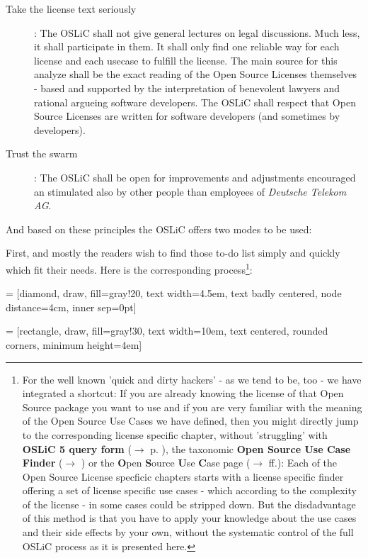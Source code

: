 \begin{description}
  \item[Take the license text seriously]: The OSLiC shall not give general
  lectures on legal discussions. Much less, it shall participate in them. It
  shall only find one reliable way for each license and each usecase to fulfill
  the license. The main source for this analyze shall be the exact reading of
  the Open Source Licenses themselves - based and supported by the
  interpretation of benevolent lawyers and rational argueing software
  developers. The OSLiC shall respect that Open Source Licenses are written for
  software developers (and sometimes by developers).
  
  \item[Trust the swarm]: The OSLiC shall be open for improvements and
  adjustments encouraged an stimulated also by other people than employees of
  \emph{Deutsche Telekom AG}.
\end{description}

And based on these principles the OSLiC offers two modes to be used:

First, and mostly the readers wish to find those to-do list simply and quickly
which fit their needs. Here is the corresponding process\footnote{For the well
known 'quick and dirty hackers' - as we tend to be, too - we have integrated a
shortcut: If you are already knowing the license of that Open Source package you
want to use and if you are very familiar with the meaning of the Open Source Use
Cases we have defined, then you might directly jump to the corresponding license
specific chapter, without 'struggling' with \textbf{OSLiC 5 query form}
($\rightarrow$ p. \pageref{OSLiCStandardFormForGatheringInformation}), the
taxonomic \textbf{Open Source Use Case Finder} ($\rightarrow$
\pageref{OSLiCUseCaseFinder}) or the \textbf{O}pen \textbf{S}ource \textbf{U}se
\textbf{C}ase page ($\rightarrow$ \pageref{OSUCList}ff.): Each of the Open
Source License specficic chapters starts with a license specific finder offering
a set of license specific use cases - which according to the complexity of the
license - in some cases could be stripped down. But the disdadvantage of this
method is that you have to apply your knowledge about the use cases and their
side effects by your own, without the systematic control of the full OSLiC
process as it is presented here.
}:

 = [diamond, draw, fill=gray!20, 
    text width=4.5em, text badly centered, node distance=4cm, inner sep=0pt]

 = [rectangle, draw, fill=gray!30, 
    text width=10em, text centered, rounded corners, minimum height=4em]
 
